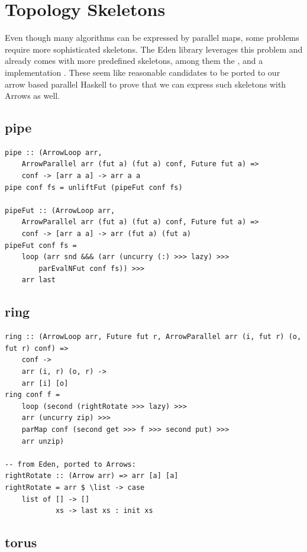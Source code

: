 \section{Topology Skeletons}
Even though many algorithms can be expressed by parallel maps, some problems require more sophisticated skeletons. The Eden library leverages this problem and already comes with more predefined skeletons, among them the ,  and a  implementation \cite{eden_cefp, eden_skel_topology}. These seem like reasonable candidates to be ported to our arrow based parallel Haskell to prove that we can express such skeletons with Arrows as well.

\subsection{pipe}

\begin{lstlisting}[frame=htrbl]
pipe :: (ArrowLoop arr,
	ArrowParallel arr (fut a) (fut a) conf, Future fut a) =>
	conf -> [arr a a] -> arr a a
pipe conf fs = unliftFut (pipeFut conf fs)

pipeFut :: (ArrowLoop arr,
	ArrowParallel arr (fut a) (fut a) conf, Future fut a) =>
	conf -> [arr a a] -> arr (fut a) (fut a)
pipeFut conf fs =
	loop (arr snd &&& (arr (uncurry (:) >>> lazy) >>>
		parEvalNFut conf fs)) >>>
	arr last
\end{lstlisting}

\subsection{ring}

\begin{lstlisting}[frame=htrbl]
ring :: (ArrowLoop arr, Future fut r, ArrowParallel arr (i, fut r) (o, fut r) conf) =>
    conf ->
    arr (i, r) (o, r) ->
    arr [i] [o]
ring conf f =
	loop (second (rightRotate >>> lazy) >>>
    arr (uncurry zip) >>>
    parMap conf (second get >>> f >>> second put) >>>
    arr unzip)

-- from Eden, ported to Arrows:
rightRotate :: (Arrow arr) => arr [a] [a]
rightRotate = arr $ \list -> case
	list of [] -> []
			xs -> last xs : init xs
\end{lstlisting}

\subsection{torus}

